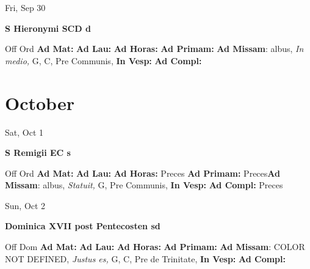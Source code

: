 \documentclass[10pt]{book}
\begin{document}
\begin{center}
\begin{minipage}{3.5in}
\vspace{2em}
\begin{center}Fri, Sep 30
\end{center}
\textbf{ \large S Hieronymi SCD
\textnormal{\normalsize d}}

\begin{justify}Off Ord
\textbf{Ad Mat: }
\textbf{Ad Lau: }
\textbf{Ad Horas: }
\textbf{Ad Primam: }\textbf{Ad Missam}: albus, \textit{In medio,} G, C, Pre Communis, 
\textbf{In Vesp: }
\textbf{Ad Compl: }
\end{justify}
\end{minipage}
\end{center}

    \chapter*{October}
                    
\begin{center}
\begin{minipage}{3.5in}
\vspace{2em}
\begin{center}Sat, Oct 1
\end{center}
\textbf{ \large S Remigii EC
\textnormal{\normalsize s}}

\begin{justify}Off Ord
\textbf{Ad Mat: }
\textbf{Ad Lau: }
\textbf{Ad Horas: }Preces
\textbf{Ad Primam: }Preces\textbf{Ad Missam}: albus, \textit{Statuit,} G, Pre Communis, 
\textbf{In Vesp: }
\textbf{Ad Compl: }Preces
\end{justify}
\end{minipage}
\end{center}

\begin{center}
\begin{minipage}{3.5in}
\vspace{2em}
\begin{center}Sun, Oct 2
\end{center}
\textbf{ \large Dominica XVII post Pentecosten
\textnormal{\normalsize sd}}

\begin{justify}Off Dom
\textbf{Ad Mat: }
\textbf{Ad Lau: }
\textbf{Ad Horas: }
\textbf{Ad Primam: }\textbf{Ad Missam}: COLOR NOT DEFINED, \textit{Justus es,} G, C, Pre de Trinitate, 
\textbf{In Vesp: }
\textbf{Ad Compl: }
\end{justify}
\end{minipage}
\end{center}
\end{document}
